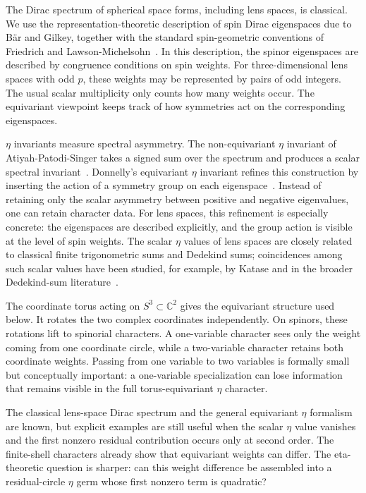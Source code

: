 \documentclass{article}
\theoremstyle{definition}
\numberwithin{equation}{section}
\begin{document}
The Dirac spectrum of spherical space forms, including lens spaces, is classical.  We use the representation-theoretic description of spin Dirac eigenspaces due to B\"ar and Gilkey, together with the standard spin-geometric conventions of Friedrich and Lawson-Michelsohn~\cite{GilkeySpherical, BaerSpaceForms,FriedrichDirac,LawsonMichelsohn}.  In this description, the spinor eigenspaces are described by congruence conditions on spin weights.  For three-dimensional lens spaces with odd $p$, these weights may be represented by pairs of odd integers.  The usual scalar multiplicity only counts how many weights occur.  The equivariant viewpoint keeps track of how symmetries act on the corresponding eigenspaces.

$\eta$ invariants measure spectral asymmetry.  The non-equivariant $\eta$ invariant of Atiyah-Patodi-Singer takes a signed sum over the spectrum and produces a scalar spectral invariant~\cite{APS1,APS2,APS3}.  Donnelly's equivariant $\eta$ invariant refines this construction by inserting the action of a symmetry group on each eigenspace~\cite{DonnellyGSpaces}.  
Instead of retaining only the scalar asymmetry between positive and negative eigenvalues, one can retain character data.  For lens spaces, this refinement is especially concrete: the eigenspaces are described explicitly, and the group action is visible at the level of spin weights.  The scalar $\eta$ values of lens spaces are closely related to classical finite trigonometric sums and Dedekind sums; coincidences among such scalar values have been studied, for example, by Katase and in the broader Dedekind-sum literature~\cite{KataseDedekindEta,KataseClassifyingEta,KirbyMelvinDedekind,JabukaRobinsWangDedekind}.

The coordinate torus acting on $S^3\subset\mathbb C^2$ gives the equivariant structure used below.  It rotates the two complex coordinates independently.  On spinors, these rotations lift to spinorial characters.  A one-variable character sees only the weight coming from one coordinate circle, while a two-variable character retains both coordinate weights.  Passing from one variable to two variables is formally small but conceptually important: a one-variable specialization can lose information that remains visible in the full torus-equivariant $\eta$ character.

The classical lens-space Dirac spectrum and the general equivariant $\eta$ formalism are known, but explicit examples are still useful when the scalar $\eta$ value vanishes and the first nonzero residual contribution occurs only at second order.  The finite-shell characters already show that equivariant weights can differ.  The eta-theoretic question is sharper: can this weight difference be assembled into a residual-circle $\eta$ germ whose first nonzero term is quadratic?
\end{document}
